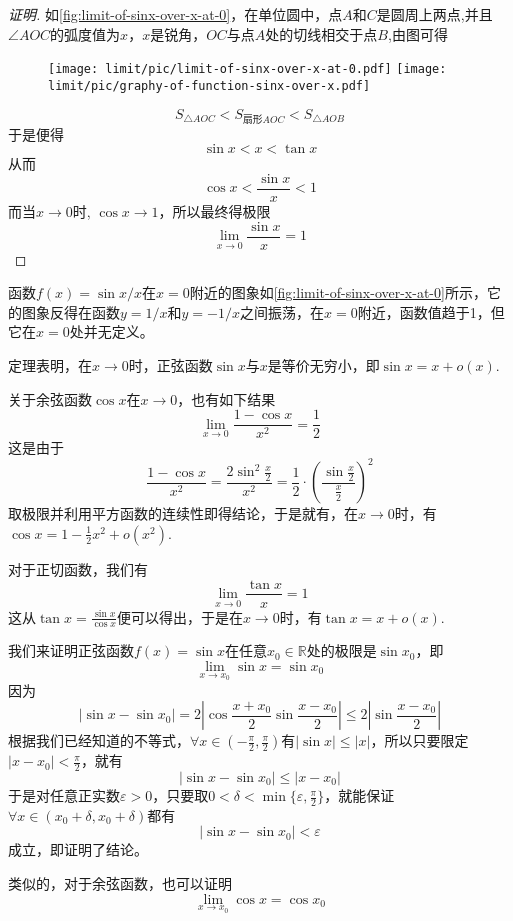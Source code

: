 \begin{proof}[证明]

  如\autoref{fig:limit-of-sinx-over-x-at-0}，在单位圆中，点$A$和$C$是圆周上两点,并且$\angle AOC$的弧度值为$x$，$x$是锐角，$OC$与点$A$处的切线相交于点$B$,由图可得
  
\begin{figure}[htbp]
\centering
\texttt{[image: limit/pic/limit-of-sinx-over-x-at-0.pdf]}
\texttt{[image: limit/pic/graphy-of-function-sinx-over-x.pdf]}
\caption{}
\label{fig:limit-of-sinx-over-x-at-0}
\end{figure}

  \[ S_{\triangle AOC} < S_{\text{扇形}AOC} < S_{\triangle AOB} \]
  于是便得
  \[ \sin{x} < x < \tan{x} \]
  从而
  \[ \cos{x} < \frac{\sin{x}}{x} < 1 \]
  而当$x \to 0$时, $\cos{x} \to 1$，所以最终得极限
  \[ \lim_{x \to 0} \frac{\sin{x}}{x} = 1 \]
\end{proof}

函数$f(x)=\sin{x}/x$在$x=0$附近的图象如\autoref{fig:limit-of-sinx-over-x-at-0}所示，它的图象反得在函数$y=1/x$和$y=-1/x$之间振荡，在$x=0$附近，函数值趋于1，但它在$x=0$处并无定义。

定理表明，在$x \to 0$时，正弦函数$\sin{x}$与$x$是等价无穷小，即$\sin{x}=x+o(x)$.

\begin{example}
  关于余弦函数$\cos{x}$在$x \to 0$，也有如下结果
  \[ \lim_{x \to 0} \frac{1-\cos{x}}{x^2} = \frac{1}{2} \]
  这是由于
    \[ \frac{1-\cos{x}}{x^2} = \frac{2\sin^2 \frac{x}{2}}{x^2} = \frac{1}{2} \cdot \left( \frac{\sin{\frac{x}{2}}}{\frac{x}{2}} \right)^2 \]
    取极限并利用平方函数的连续性即得结论，于是就有，在$x \to 0$时，有$\cos{x}=1-\frac{1}{2}x^2+o(x^2)$.
\end{example}

\begin{example}
  对于正切函数，我们有
  \[ \lim_{x \to 0} \frac{\tan{x}}{x} = 1 \]
  这从$\tan{x}=\frac{\sin{x}}{\cos{x}}$便可以得出，于是在$x \to 0$时，有$\tan{x} = x + o(x)$.
\end{example}

\begin{example}
  \label{example:limit-of-sin-cos-function}
  我们来证明正弦函数$f(x)=\sin{x}$在任意$x_0 \in \mathbb{R}$处的极限是$\sin{x_0}$，即
  \[ \lim_{x \to x_0} \sin{x} = \sin{x_0} \]
  因为
  \[ |\sin{x}-\sin{x_0}| = 2 \left| \cos{\frac{x+x_0}{2}} \sin{\frac{x-x_0}{2}} \right| \leqslant 2 \left| \sin{\frac{x-x_0}{2}} \right| \]
  根据我们已经知道的不等式，$\forall x \in \left(- \frac{\pi}{2}, \frac{\pi}{2} \right)$有$|\sin{x}| \leqslant |x|$，所以只要限定$|x-x_0|<\frac{\pi}{2}$，就有
  \[ |\sin{x}-\sin{x_0}| \leqslant |x-x_0| \]
  于是对任意正实数$\varepsilon>0$，只要取$0<\delta<\min\{\varepsilon, \frac{\pi}{2}\}$，就能保证$\forall x \in ( x_0+\delta,x_0+\delta )$都有
  \[ |\sin{x}-\sin{x_0}| < \varepsilon \]
  成立，即证明了结论。

  类似的，对于余弦函数，也可以证明
  \[ \lim_{x \to x_0} \cos{x} = \cos{x_0} \]
\end{example}

